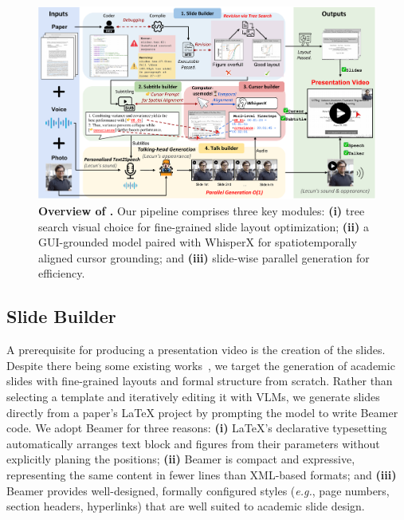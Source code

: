 \vspace{-0.4\baselineskip} 
\begin{figure}[t]
    \centering
    \includegraphics[width=\linewidth]{figure/method.pdf}
    \caption{\textbf{Overview of {\agent}.} Our pipeline comprises three key modules: \textbf{(i)} tree search visual choice for fine-grained slide layout optimization; \textbf{(ii)} a GUI-grounded model paired with WhisperX for spatiotemporally aligned cursor grounding; and \textbf{(iii)} slide-wise parallel generation for efficiency.}
    \label{fig:method}
\end{figure}

\subsection{Slide Builder}
\vspace{-0.4\baselineskip}
A prerequisite for producing a presentation video is the creation of the slides. Despite there being some existing works~\cite{zheng2025pptagent}, we target the generation of academic slides with fine-grained layouts and formal structure from scratch.
Rather than selecting a template and iteratively editing it with VLMs, we generate slides directly from a paper’s \LaTeX{} project by prompting the model to write Beamer code. We adopt Beamer for three reasons: \textbf{(i)} \LaTeX{}’s declarative typesetting automatically arranges text block and figures from their parameters without explicitly planing the positions; \textbf{(ii)} Beamer is compact and expressive, representing the same content in fewer lines than XML-based formats; and \textbf{(iii)} Beamer provides well-designed, formally configured styles (\textit{e.g.}, page numbers, section headers, hyperlinks) that are well suited to academic slide design.

